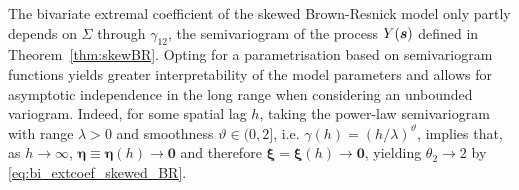 \documentclass[12pt]{article}
\begin{document}
The bivariate extremal coefficient of the skewed Brown-Resnick model only partly depends on $\Sigma$ through $\gamma_{12}$, the semivariogram of the process $Y({\boldsymbol{s}})$ defined in Theorem~\ref{thm:skewBR}. 
%
Opting for a parametrisation based on semivariogram functions 
yields
greater interpretability of the model parameters and allows for asymptotic independence in the long range when considering an unbounded variogram. Indeed, for some spatial lag $h$, taking the power-law semivariogram with range $\lambda>0$ and  smoothness $\vartheta \in (0,2]$, i.e. $\gamma(h) = (h/\lambda)^\vartheta$,
implies that, as $h \rightarrow \infty$, $\bm \eta \equiv \bm \eta (h) \rightarrow \bm 0$ and therefore $\bm \xi = \bm \xi(h) \rightarrow \bm 0$, yielding $\theta_2 \rightarrow 2$ by \eqref{eq:bi_extcoef_skewed_BR}.
%
\end{document}
